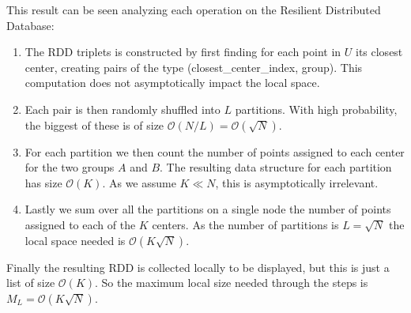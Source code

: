 \documentclass[12pt,a4paper]{article}
\begin{document}
This result can be seen analyzing each operation on the Resilient Distributed Database:
\begin{enumerate}
    \item The RDD triplets is constructed by first finding for each point in $U$ its closest center, creating pairs of the type (closest\_center\_index, group).
    This computation does not asymptotically impact the local space.
    \item Each pair is then randomly shuffled into $L$ partitions. With high probability, the biggest of these is of size $\mathcal{O}(N/L) = \mathcal{O}(\sqrt{N})$.
    \item For each partition we then count the number of points assigned to each center for the two groups $A$ and $B$. The resulting data structure for each partition has size $\mathcal{O}(K)$. As we assume $K \ll N$, this is asymptotically irrelevant.
    \item Lastly we sum over all the partitions on a single node the number of points assigned to each of the $K$ centers. As the number of partitions is $L = \sqrt{N}$ the local space needed is $\mathcal{O}(K\sqrt{N})$.
\end{enumerate}
Finally the resulting RDD is collected locally to be displayed, but this is just a list of size $\mathcal{O}(K)$. So the maximum local size needed through the steps is $M_L = \mathcal{O}(K\sqrt{N})$.
\end{document}

